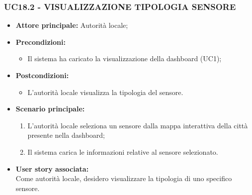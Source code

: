 \subsubsection{UC18.2 - VISUALIZZAZIONE TIPOLOGIA SENSORE}
\begin{itemize}
    \item \textbf{Attore principale:} Autorità locale;
    \item \textbf{Precondizioni:}
        \begin{itemize}
            \item Il sistema ha caricato la visualizzazione della dashboard (UC1);
        \end{itemize}
    \item \textbf{Postcondizioni:}
        \begin{itemize}
            \item L'autorità locale visualizza la tipologia del sensore.
        \end{itemize}
    \item \textbf{Scenario principale:}
        \begin{enumerate}
            \item L'autorità locale seleziona un sensore dalla mappa interattiva della città presente nella dashboard;
            \item Il sistema carica le informazioni relative al sensore selezionato.
        \end{enumerate}
    \item \textbf{User story associata:} \\
        Come autorità locale, desidero visualizzare la tipologia di uno specifico sensore.
\end{itemize}